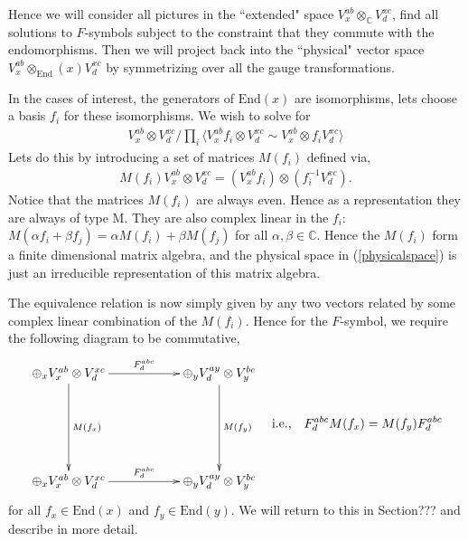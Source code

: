 \documentclass[12pt,a4paper]{article}
\newcommand{\tp}{\otimes}
\begin{document}
Hence we will consider all pictures in the ``extended" space $V^{ab}_x \tp_\mathbb{C} V^{xc}_d$, find all solutions to $F$-symbols subject to the constraint that they commute with the endomorphisms. 
Then we will project back into the ``physical" vector space $V^{ab}_x \tp_\text{End}(x) V^{xc}_d$ by symmetrizing over all the gauge transformations.

In the cases of interest, the generators of $\text{End}(x)$ are isomorphisms, lets choose a basis $f_i$ for these isomorphisms.
We wish to solve for 
\begin{align}
V^{ab}_x \tp V^{xc}_d /\prod_i \langle V^{ab}_x f_i \tp V^{xc}_d \sim V^{ab}_x  \tp f_i V^{xc}_d  \rangle
\label{physicalspace}
\end{align}
Lets do this by introducing a set of matrices $M(f_i)$ defined via,
\begin{align}
M(f_i) V^{ab}_x \tp V^{xc}_d = (V^{ab}_x f_i )\tp (f_i^{-1} V^{xc}_d).
\end{align}
Notice that the matrices $M(f_i)$ are always even. 
Hence as a representation they are always of type M.
They are also complex linear in the $f_i$: $M(\alpha f_i + \beta f_j) = \alpha M(f_i) + \beta M(f_j) $ for all $ \alpha, \beta \in \mathbb{C}$.
Hence the $M(f_i)$ form a finite dimensional matrix algebra, and the physical space in (\ref{physicalspace}) is just an irreducible representation of this matrix algebra. 

The equivalence relation is now simply given by any two vectors related by some complex linear combination of the $M(f_i)$. 
Hence for the $F$-symbol, we require the following diagram to be commutative, 
\begin{align}
	\vcenter{\xymatrix @!0 @M=1mm @R=30mm @C=42mm{
		 \oplus_x V^{ab}_x \otimes V^{xc}_d \ar[d]^{M(f_x)}\ar[r]^{F^{abc}_d}& \oplus_y V^{ay}_d \otimes V^{bc}_y \ar[d]^{M(f_y)} \\
		\oplus_x V^{ab}_x \otimes V^{xc}_d  \ar[r]^{F^{abc}_d}  & \oplus_y V^{ay}_d \otimes V^{bc}_y	
	}} \quad \text{i.e.,} \quad F^{abc}_d M(f_x) = M(f_y) F^{abc}_d
\end{align}
for all $f_x \in \text{End}(x)$ and $f_y \in \text{End}(y)$.
We will return to this in Section??? and describe in more detail. 
\end{document}

